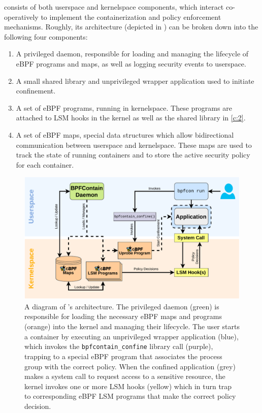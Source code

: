 \bpfcontain{} consists of both userspace and kernelspace components, which
interact co-operatively to implement the containerization and policy enforcement
mechanisms. Roughly, its architecture (depicted in ) can
be broken down into the following four components:
\begin{enumerate}[label=\bfseries C\arabic*., ref=C\arabic*, labelindent=1em]

  \item \label{c:1}
  A privileged daemon, responsible for loading and managing the lifecycle of
  eBPF programs and maps, as well as logging security events to userspace.

  \item \label{c:2}
  A small shared library and unprivileged wrapper application used to initiate
  confinement.

  \item \label{c:3}
  A set of eBPF programs, running in kernelspace. These programs are attached to
  LSM hooks in the kernel as well as the shared library in \ref{c:2}.

  \item \label{c:4}
  A set of eBPF maps, special data structures which allow bidirectional
  communication between userspace and kernelspace. These maps are used to track
  the state of running containers and to store the active security policy for
  each container.
\end{enumerate}

\begin{figure}[htpb]
  \centering
  \includegraphics[width=1\linewidth]{figs/architecture.pdf}
  \caption{
    A diagram of \bpfcontain{}'s architecture. The privileged daemon (green) is
    responsible for loading the necessary eBPF maps and programs (orange) into
    the kernel and managing their lifecycle. The user starts a container by
    executing an unprivileged wrapper application (blue), which invokes the
    \texttt{bpfcontain\_confine} library call (purple), trapping to a special
    eBPF program that associates the process group with the correct policy.
    When the confined application (grey) makes a system call to request access
    to a sensitive resource, the kernel invokes one or more LSM hooks (yellow)
    which in turn trap to corresponding eBPF LSM programs that make the correct
    policy decision.
  }%
  \label{fig:architecture}
\end{figure}

